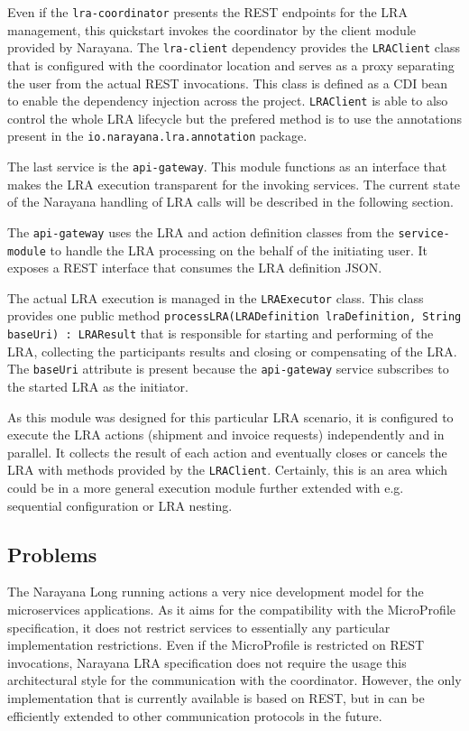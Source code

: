 \documentclass[oneside,
  digital, %
  table,   %
  nolof,     %
  nolot,     %
]{fithesis3}
\begin{document}
Even if the \texttt{lra-coordinator} presents the REST endpoints for the LRA management, this quickstart invokes the coordinator by the client module provided by Narayana. The \texttt{lra-client} dependency provides the \texttt{LRAClient} class that is configured with the coordinator location and serves as a proxy separating the user from the actual REST invocations. This class is defined as a CDI bean to enable the dependency injection across the project. \texttt{LRAClient} is able to also control the whole LRA lifecycle but the prefered method is to use the annotations present in the \texttt{io.narayana.lra.annotation} package.

The last service is the \texttt{api-gateway}. This module functions as an interface that makes the LRA execution transparent for the invoking services. The current state of the Narayana handling of LRA calls will be described in the following section.

The \texttt{api-gateway} uses the LRA and action definition classes from the \texttt{service-module} to handle the LRA processing on the behalf of the initiating user. It exposes a REST interface that consumes the LRA definition JSON.

The actual LRA execution is managed in the \texttt{LRAExecutor} class. This class provides one public method \texttt{processLRA(LRADefinition lraDefinition, String baseUri) : LRAResult} that is responsible for starting and performing of the LRA, collecting the participants results and closing or compensating of the LRA. The \texttt{baseUri} attribute is present because the \texttt{api-gateway} service subscribes to the started LRA as the initiator.

As this module was designed for this particular LRA scenario, it is configured to execute the LRA actions (shipment and invoice requests) independently and in parallel. It collects the result of each action and eventually closes or cancels the LRA with methods provided by the \texttt{LRAClient}. Certainly, this is an area which could be in a more general execution module further extended with e.g. sequential configuration or LRA nesting.

\subsection{Problems}

The Narayana Long running actions a very nice development model for the microservices applications. As it aims for the compatibility with the MicroProfile specification, it does not restrict services to essentially any particular implementation restrictions. Even if the MicroProfile is restricted on REST invocations, Narayana LRA specification does not require the usage this architectural style for the communication with the coordinator. However, the only implementation that is currently available is based on REST, but in can be efficiently extended to other communication protocols in the future.
\end{document}
